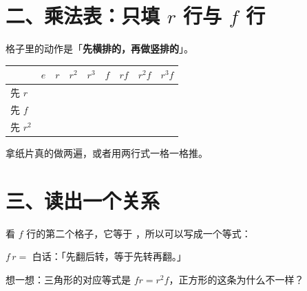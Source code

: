 \documentclass[11pt]{ctexart}
\begin{document}
\section*{二、乘法表：只填 \(r\) 行与 \(f\) 行}

\noindent 格子里的动作是「\textbf{先横排的，再做竖排的}」。

\begin{center}
{\small
\begin{tabular}{@{}l|cccccccc@{}}
  \toprule
   & \(e\) & \(r\) & \(r^2\) & \(r^3\) & \(f\) & \(rf\) & \(r^2f\) & \(r^3f\) \\
  \midrule
  \rule{0pt}{3.2ex}先 \(r\) & & & & & & & & \\
  \rule{0pt}{3.2ex}先 \(f\) & & & & & & & & \\
  \rule{0pt}{3.2ex}先 \(r^2\) & & & & & & & & \\
  \bottomrule
\end{tabular}}
\end{center}

\noindent 拿纸片真的做两遍，或者用两行式一格一格推。

\section*{三、读出一个关系}

\noindent 看 \(f\) 行的第二个格子，它等于 \underline{\hspace{3em}}，所以可以写成一个等式：

\vspace{0.4em}
\noindent\hfill \(f\,r=\) \underline{\hspace{3.4em}}\hfill 白话：「先翻后转，等于先\underline{\hspace{1.6em}}转再翻。」\hfill

\vspace{0.7em}
\noindent 想一想：三角形的对应等式是 \(fr=r^2f\)，正方形的这条为什么不一样？
\underline{\hspace{5cm}}
\end{document}
